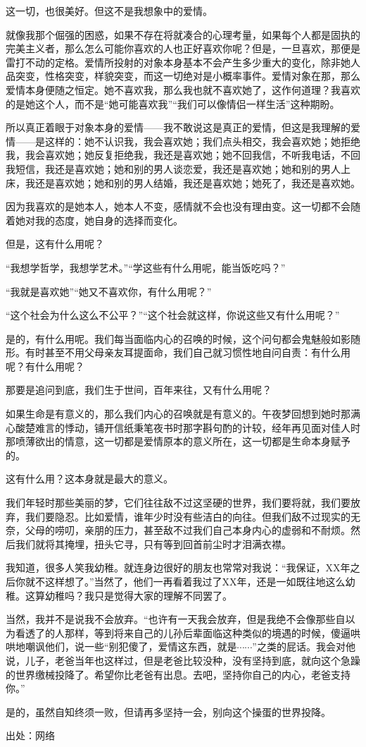 这一切，也很美好。但这不是我想象中的爱情。 

就像我那个倔强的困惑，如果不存在将就凑合的心理考量，如果每个人都是固执的完美主义者，那么怎么可能你喜欢的人也正好喜欢你呢？但是，一旦喜欢，那便是雷打不动的定格。爱情所投射的对象本身基本不会产生多少重大的变化，除非她人品突变，性格突变，样貌突变，而这一切绝对是小概率事件。爱情对象在那，那么爱情本身便随之恒定。她不喜欢我，那么我也就不喜欢她了，这作何道理？我喜欢的是她这个人，而不是“她可能喜欢我”“我们可以像情侣一样生活”这种期盼。 

所以真正着眼于对象本身的爱情——我不敢说这是真正的爱情，但这是我理解的爱情——是这样的：她不认识我，我会喜欢她；我们点头相交，我会喜欢她；她拒绝我，我会喜欢她；她反复拒绝我，我还是喜欢她；她不回我信，不听我电话，不回我短信，我还是喜欢她；她和别的男人谈恋爱，我还是喜欢她；她和别的男人上床，我还是喜欢她；她和别的男人结婚，我还是喜欢她；她死了，我还是喜欢她。 

因为我喜欢的是她本人，她本人不变，感情就不会也没有理由变。这一切都不会随着她对我的态度，她自身的选择而变化。 

但是，这有什么用呢？ 

“我想学哲学，我想学艺术。”“学这些有什么用呢，能当饭吃吗？” 

“我就是喜欢她”“她又不喜欢你，有什么用呢？” 

“这个社会为什么这么不公平？”“这个社会就这样，你说这些又有什么用呢？” 

是的，有什么用呢。我们每当面临内心的召唤的时候，这个问句都会鬼魅般如影随形。有时甚至不用父母亲友耳提面命，我们自己就习惯性地自问自责：有什么用呢？有什么用呢？ 

那要是追问到底，我们生于世间，百年来往，又有什么用呢？ 

如果生命是有意义的，那么我们内心的召唤就是有意义的。午夜梦回想到她时那满心酸楚难言的悸动，铺开信纸秉笔夜书时那字斟句酌的计较，经年再见面对佳人时那喷薄欲出的情意，这一切都是爱情原本的意义所在，这一切都是生命本身赋予的。 

这有什么用？这本身就是最大的意义。 

我们年轻时那些美丽的梦，它们往往敌不过这坚硬的世界，我们要将就，我们要放弃，我们要隐忍。比如爱情，谁年少时没有些洁白的向往。但我们敌不过现实的无奈，父母的唠叨，亲朋的压力，甚至敌不过我们自己本身内心的虚弱和不耐烦。然后我们就将其掩埋，扭头它寻，只有等到回首前尘时才泪满衣襟。 

我知道，很多人笑我幼稚。就连身边很好的朋友也常常对我说：“我保证，XX年之后你就不这样想了。”当然了，他们一再看着我过了XX年，还是一如既往地这么幼稚。这算幼稚吗？我只是觉得大家的理解不同罢了。 

当然，我并不是说我不会放弃。“也许有一天我会放弃，但是我绝不会像那些自以为看透了的人那样，等到将来自己的儿孙后辈面临这种类似的境遇的时候，傻逼哄哄地嘲讽他们，说一些“别犯傻了，爱情这东西，就是$\cdots\cdots$”之类的屁话。我会对他说，儿子，老爸当年也这样过，但是老爸比较没种，没有坚持到底，就向这个急躁的世界缴械投降了。希望你比老爸有出息。去吧，坚持你自己的内心，老爸支持你。” 

是的，虽然自知终须一败，但请再多坚持一会，别向这个操蛋的世界投降。


出处：网络



\clearpage

